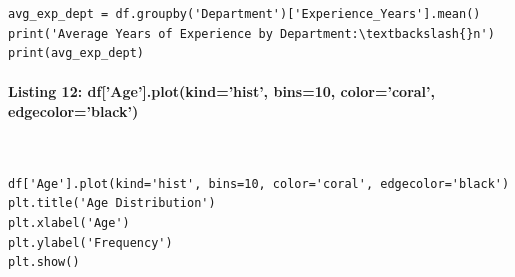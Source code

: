 \documentclass[12pt,a4paper,oneside]{report}
\begin{document}
\begin{Verbatim}[commandchars=\\\{\},breaklines=true,breakanywhere=true,fontsize=\scriptsize,frame=leftline,framesep=2mm,rulecolor=\color{gray}]
avg_exp_dept = df.groupby('Department')['Experience_Years'].mean()
print('Average Years of Experience by Department:\textbackslash{}n')
print(avg_exp_dept)
\end{Verbatim}
\paragraph{Listing 12: df['Age'].plot(kind='hist', bins=10, color='coral', edgecolor='black')}\mbox{}\\[-1ex]
\begin{Verbatim}[commandchars=\\\{\},breaklines=true,breakanywhere=true,fontsize=\scriptsize,frame=leftline,framesep=2mm,rulecolor=\color{gray}]
df['Age'].plot(kind='hist', bins=10, color='coral', edgecolor='black')
plt.title('Age Distribution')
plt.xlabel('Age')
plt.ylabel('Frequency')
plt.show()
\end{Verbatim}
\end{document}
